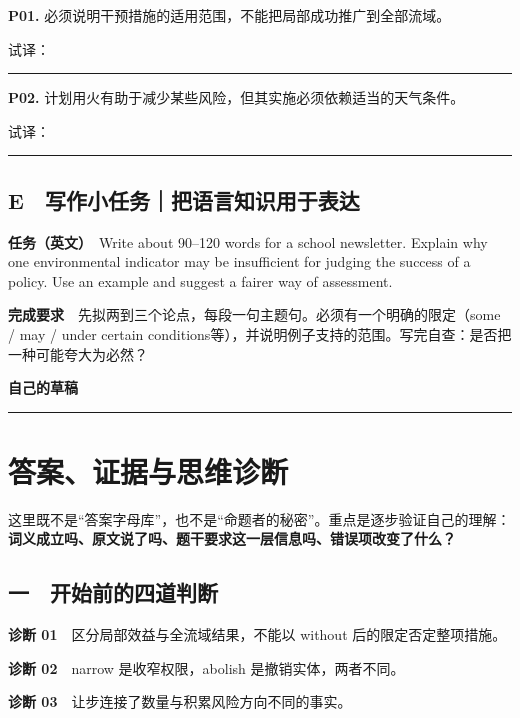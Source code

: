 \documentclass[
  11pt,
]{ctexart}
\begin{document}
\textbf{P01.} 必须说明干预措施的适用范围，不能把局部成功推广到全部流域。

试译：

\rule{0.8\linewidth}{0.35pt}

\textbf{P02.}
计划用火有助于减少某些风险，但其实施必须依赖适当的天气条件。

试译：

\rule{0.8\linewidth}{0.35pt}

\subsection{E　写作小任务｜把语言知识用于表达}\label{e-ux5199ux4f5cux5c0fux4efbux52a1ux628aux8bedux8a00ux77e5ux8bc6ux7528ux4e8eux8868ux8fbe}

\textbf{任务（英文）}　Write about 90--120 words for a school
newsletter. Explain why one environmental indicator may be insufficient
for judging the success of a policy. Use an example and suggest a fairer
way of assessment.

\textbf{完成要求}　先拟两到三个论点，每段一句主题句。必须有一个明确的限定（some
/ may / under certain
conditions等），并说明例子支持的范围。写完自查：是否把一种可能夸大为必然？

\textbf{自己的草稿}

\vspace{2cm}\rule{0.95\linewidth}{0.35pt}\vspace{0.6cm}

\clearpage

\section{答案、证据与思维诊断}\label{ux7b54ux6848ux8bc1ux636eux4e0eux601dux7ef4ux8bcaux65ad}

这里既不是``答案字母库''，也不是``命题者的秘密''。重点是逐步验证自己的理解：\textbf{词义成立吗、原文说了吗、题干要求这一层信息吗、错误项改变了什么？}

\subsection{一　开始前的四道判断}\label{ux4e00-ux5f00ux59cbux524dux7684ux56dbux9053ux5224ux65ad}

\textbf{诊断 01}　区分局部效益与全流域结果，不能以 without
后的限定否定整项措施。

\textbf{诊断 02}　narrow 是收窄权限，abolish 是撤销实体，两者不同。

\textbf{诊断 03}　让步连接了数量与积累风险方向不同的事实。
\end{document}
